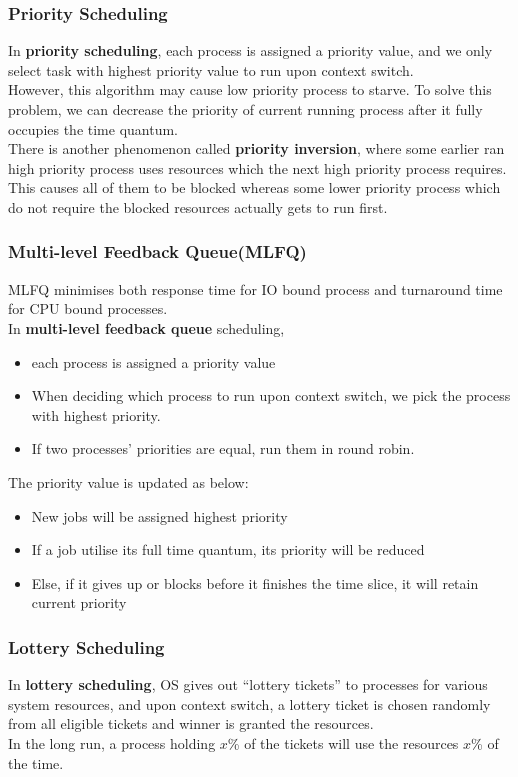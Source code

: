 \documentclass[12pt]{article}
\theoremstyle{definition}
\begin{document}
\subsubsection{Priority Scheduling}
In \textbf{priority scheduling}, each process is assigned a priority value, and we only select task with highest priority value to run upon context switch.\\
However, this algorithm may cause low priority process to starve. To solve this problem, we can decrease the priority of current running process after it fully occupies the time quantum.\\
There is another phenomenon called \textbf{priority inversion}, where some earlier ran high priority process uses resources which the next high priority process requires. This causes all of them to be blocked whereas some lower priority process which do not require the blocked resources actually gets to run first.
\subsubsection{Multi-level Feedback Queue(MLFQ)}
MLFQ minimises both response time for IO bound process and turnaround time for CPU bound processes.\\
In \textbf{multi-level feedback queue} scheduling, 
\begin{itemize}
  \item each process is assigned a priority value
  \item When deciding which process to run upon context switch, we pick the process with highest priority.
  \item If two processes' priorities are equal, run them in round robin.
\end{itemize} 
The priority value is updated as below:
\begin{itemize}
  \item New jobs will be assigned highest priority
  \item If a job utilise its full time quantum, its priority will be reduced
  \item Else, if it gives up or blocks before it finishes the time slice, it will retain current priority
\end{itemize}
\subsubsection{Lottery Scheduling}
In \textbf{lottery scheduling}, OS gives out ``lottery tickets'' to processes for various system resources, and upon context switch, a lottery ticket is chosen randomly from all eligible tickets and winner is granted the resources.\\
In the long run, a process holding $x$\% of the tickets will use the resources $x$\% of the time. 
\end{document}
